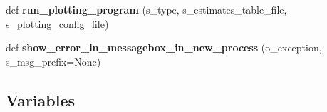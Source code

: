 \begin{DoxyCompactItemize}
\item 
def {\bfseries run\+\_\+plotting\+\_\+program} (s\+\_\+type, s\+\_\+estimates\+\_\+table\+\_\+file, s\+\_\+plotting\+\_\+config\+\_\+file)\hypertarget{namespacenegui_1_1pgutilities_a1e7a7774f29fea829d3b29563c8dd643}{}\label{namespacenegui_1_1pgutilities_a1e7a7774f29fea829d3b29563c8dd643}

\item 
def {\bfseries show\+\_\+error\+\_\+in\+\_\+messagebox\+\_\+in\+\_\+new\+\_\+process} (o\+\_\+exception, s\+\_\+msg\+\_\+prefix=None)\hypertarget{namespacenegui_1_1pgutilities_a3f2675bc8eb3aae305ba8cc0c7df8d33}{}\label{namespacenegui_1_1pgutilities_a3f2675bc8eb3aae305ba8cc0c7df8d33}

\end{DoxyCompactItemize}
\subsection*{Variables}
